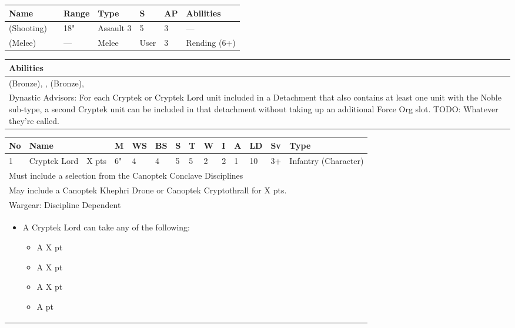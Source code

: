 \noindent
\begin{tabular}{||m{110pt} m{30pt} m{31pt} m{55pt} m{12pt} m{12pt} m{210pt}||}
	\hline
	Name & & Range & Type & S & AP & Abilities \\
	\hline
	\quickref{Staff of Light} (Shooting) & & 18" & Assault 3 & 5 & 3 & — \\
	\quickref{Staff of Light} (Melee) & & — & Melee & User & 3 & Rending (6+) \\
	\hline
\end{tabular}

\noindent
\begin{tabular}{||m{532pt}||}
	\hline
	Abilities \\
	\hline
	\quickref{Awakening Protocols}(Bronze), \quickref{Living Metal}, \quickref{Nodal Command} (Bronze), \quickref{Reanimation Protocols} \\
	Dynastic Advisors: For each Cryptek or Cryptek Lord unit included in a Detachment that also contains at least one unit with the Noble sub-type, a second Cryptek unit can be included in that detachment without taking up an additional Force Org slot. TODO: Whatever they're called. \\
	\hline
\end{tabular}



\newpage
{}

\noindent
\begin{tabular}{||m{10pt} m{95pt} m{30pt} m{11pt} m{11pt} m{11pt} m{11pt} m{11pt} m{11pt} m{11pt} m{11pt} m{11pt} m{11pt} m{125pt}||}
	\hline
	No & Name & & M & WS & BS & S & T & W & I & A & LD & Sv & Type \\
	\hline
	1 & Cryptek Lord & X pts & 6" & 4 & 4 & 5 & 5 & 2 & 2 & 1 & 10 & 3+ & Infantry (Character)\\
	\hline
	\hline
	\multicolumn{14}{||Z{532 pt}||}{Must include a selection from the Canoptek Conclave Disciplines}\\
	\multicolumn{14}{||Z{532 pt}||}{May include a Canoptek Khephri Drone or Canoptek Cryptothrall for X pts.}\\	
	\hline
	\hline
	\multicolumn{14}{||Z{532 pt}||}{Wargear: Discipline Dependent} \\		
	\multicolumn{14}{||Z{532 pt}||}{\begin{itemize}
			\item A Cryptek Lord can take any of the following:
			\begin{itemize}
				\item A \quickref{Phase Shifter} \hrulefill X pt
				\item A \quickref{Phylactery} \hrulefill X pt
				\item A \quickref{Sempiternal Weave} \hrulefill X pt
				\item A \quickref{Tesseract Labyrinth} \hrulefill 100 pt
			\end{itemize}
	\end{itemize}} \\	
	\hline
\end{tabular}

